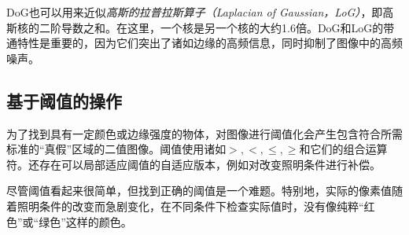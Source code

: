 
DoG也可以用来近似\emph{高斯的拉普拉斯算子（Laplacian of Gaussian，LoG）}，即高斯核的二阶导数之和。在这里，一个核是另一个核的大约1.6倍。DoG和LoG的带通特性是重要的，因为它们突出了诸如边缘的高频信息，同时抑制了图像中的高频噪声。


\subsection{基于阈值的操作}
为了找到具有一定颜色或边缘强度的物体，对图像进行阈值化会产生包含符合所需标准的“真假”区域的二值图像。阈值使用诸如$>,<,\leq,\geq$和它们的组合运算符。还存在可以局部适应阈值的自适应版本，例如对改变照明条件进行补偿。


尽管阈值看起来很简单，但找到正确的阈值是一个难题。特别地，实际的像素值随着照明条件的改变而急剧变化，在不同条件下检查实际值时，没有像纯粹“红色”或“绿色”这样的颜色。


